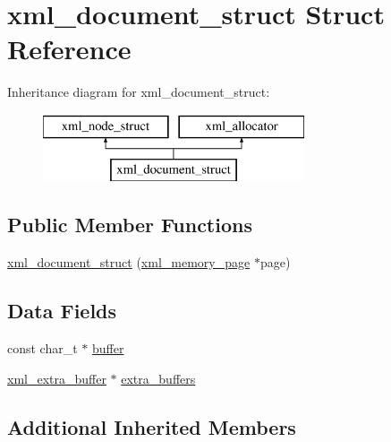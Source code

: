 \hypertarget{structxml__document__struct}{\section{xml\-\_\-document\-\_\-struct Struct Reference}
\label{structxml__document__struct}
}
Inheritance diagram for xml\-\_\-document\-\_\-struct\-:\begin{figure}[H]
\begin{center}
\leavevmode
\includegraphics[height=2.000000cm]{structxml__document__struct}
\end{center}
\end{figure}
\subsection*{Public Member Functions}
\begin{DoxyCompactItemize}
\item 
\hyperlink{structxml__document__struct_aea3482436c20abd98ca063c3bd5dcfba}{xml\-\_\-document\-\_\-struct} (\hyperlink{structxml__memory__page}{xml\-\_\-memory\-\_\-page} $\ast$page)
\end{DoxyCompactItemize}
\subsection*{Data Fields}
\begin{DoxyCompactItemize}
\item 
const char\-\_\-t $\ast$ \hyperlink{structxml__document__struct_a120451f29b8cc2a82a3ecc926449ea0e}{buffer}
\item 
\hyperlink{structxml__extra__buffer}{xml\-\_\-extra\-\_\-buffer} $\ast$ \hyperlink{structxml__document__struct_afe3b1efd5b683c306157244496f55c4b}{extra\-\_\-buffers}
\end{DoxyCompactItemize}
\subsection*{Additional Inherited Members}


